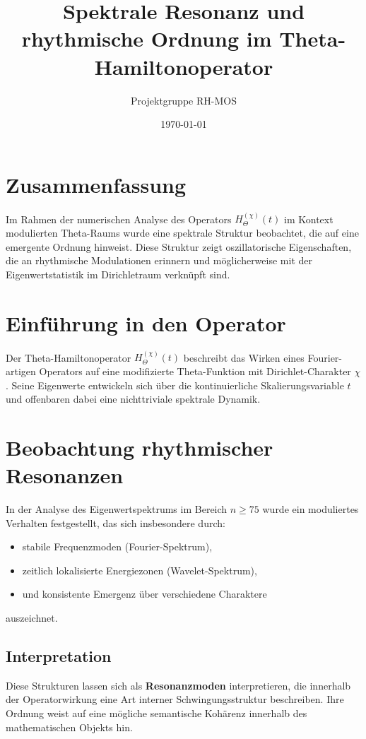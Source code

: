 \documentclass[a4paper,12pt]{article}
\title{Spektrale Resonanz und rhythmische Ordnung im Theta-Hamiltonoperator}
\author{Projektgruppe RH-MOS}
\date{\today}
\begin{document}
\maketitle

\section*{Zusammenfassung}

Im Rahmen der numerischen Analyse des Operators $H_{\Theta}^{(\chi)}(t)$ im Kontext modulierten Theta-Raums wurde eine spektrale Struktur beobachtet, die auf eine emergente Ordnung hinweist. Diese Struktur zeigt oszillatorische Eigenschaften, die an rhythmische Modulationen erinnern und möglicherweise mit der Eigenwertstatistik im Dirichletraum verknüpft sind.

\vspace{1cm}

\section{Einführung in den Operator}
Der Theta-Hamiltonoperator $H_{\Theta}^{(\chi)}(t)$ beschreibt das Wirken eines Fourier-artigen Operators auf eine modifizierte Theta-Funktion mit Dirichlet-Charakter $\chi$. Seine Eigenwerte entwickeln sich über die kontinuierliche Skalierungsvariable $t$ und offenbaren dabei eine nichttriviale spektrale Dynamik.

\section{Beobachtung rhythmischer Resonanzen}

In der Analyse des Eigenwertspektrums im Bereich $n \geq 75$ wurde ein moduliertes Verhalten festgestellt, das sich insbesondere durch:
\begin{itemize}
    \item stabile Frequenzmoden (Fourier-Spektrum),
    \item zeitlich lokalisierte Energiezonen (Wavelet-Spektrum),
    \item und konsistente Emergenz über verschiedene Charaktere
\end{itemize}
auszeichnet.

\subsection*{Interpretation}
Diese Strukturen lassen sich als \textbf{Resonanzmoden} interpretieren, die innerhalb der Operatorwirkung eine Art interner Schwingungsstruktur beschreiben. Ihre Ordnung weist auf eine mögliche semantische Kohärenz innerhalb des mathematischen Objekts hin. 
\end{document}
